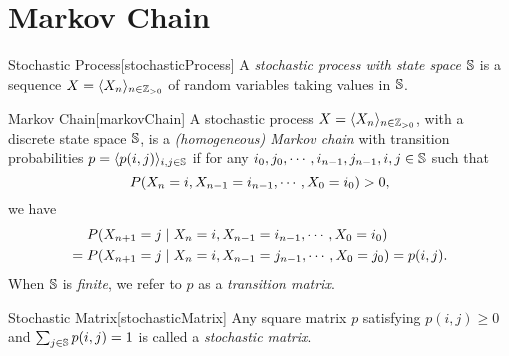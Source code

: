 \documentclass[../probability.tex]{subfiles}
\begin{document}
\section{Markov Chain}

\begin{Definition}{Stochastic Process}[stochasticProcess]
    A \emph{stochastic process with state space \(\mathbb{S}\)}
    is a sequence \(X = \lang X_n \rang_{n \in \ZZ_{>0}}\)
    of random variables taking values in \(\mathbb{S}\).
\end{Definition}

\begin{Definition}{Markov Chain}[markovChain]
    A stochastic process \(X = \lang X_n \rang_{n \in \ZZ_{>0}}\),
    with a discrete state space \(\mathbb{S}\),
    is a \emph{(homogeneous) Markov chain} with transition probabilities
    \(p = \langle p(i,j) \rangle_{i,j \in \mathbb{S}}\)
    if for any \(i_0, j_0, \cdots, i_{n-1}, j_{n-1}, i, j \in \mathbb{S}\) such that
    \[
        P(X_n = i, X_{n-1} = i_{n-1}, \cdots, X_0 = i_0) > 0\text,
    \]
    we have
    \begin{align*}
        &P(X_{n+1} = j \mid X_n = i, X_{n-1} = i_{n-1}, \cdots, X_0 = i_0) \\
        =\mbox{}&P(X_{n+1} = j \mid X_n = i, X_{n-1} = j_{n-1}, \cdots, X_0 = j_0) = p(i, j)\text.
    \end{align*}
    When \(\mathbb{S}\) is \emph{finite}, we refer to \(p\) as a \emph{transition matrix}.
\end{Definition}

\begin{Definition}{Stochastic Matrix}[stochasticMatrix]
    Any square matrix \(p\) satisfying \(p(i, j) \ge 0\)
    and \(\sum_{j \in \mathbb{S}} p(i, j) = 1\) is called a \emph{stochastic matrix}.
\end{Definition}
\end{document}

